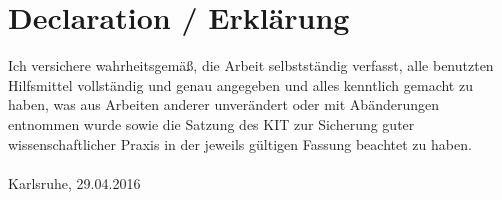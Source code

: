 
\chapter*{Declaration / Erkl\"arung}
Ich versichere wahrheitsgem\"aß, die Arbeit selbstst\"andig verfasst, alle benutzten Hilfsmittel vollst\"andig und genau angegeben und alles kenntlich gemacht zu haben, was aus Arbeiten anderer unver\"andert oder mit Ab\"anderungen entnommen wurde sowie die Satzung des KIT zur Sicherung guter wissenschaftlicher Praxis in der jeweils g\"ultigen Fassung beachtet zu haben.\\

\vspace{2cm}
\myname \\
Karlsruhe, 29.04.2016\\
